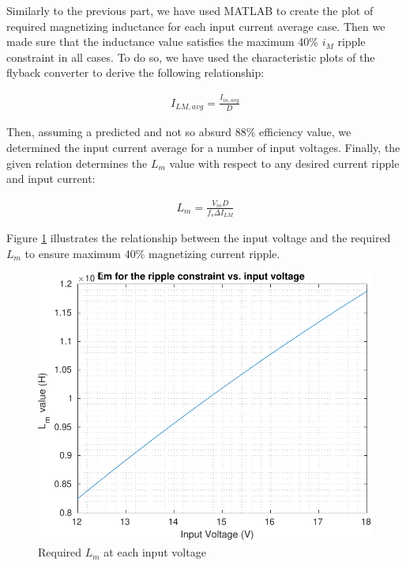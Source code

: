 \documentclass[12pt]{article}
\begin{document}
\begin{itemize}
        Similarly to the previous part, we have used MATLAB to create the plot of required magnetizing inductance for each input current average case. Then we made sure that the inductance value satisfies the maximum 40\% $i_M$ ripple constraint in all cases. To do so, we have used the characteristic plots of the flyback converter to derive the following relationship:

        \begin{align*}
            I_{LM, avg} = \frac{I_{in,avg}}{D}
        \end{align*}

        Then, assuming a predicted and not so absurd 88\% efficiency value, we determined the input current average for a number of input voltages. Finally, the given relation determines the $L_m$ value with respect to any desired current ripple and input current:

        \begin{align*}
            L_m = \frac{V_{in}D}{f_s\Delta I_{LM}}
        \end{align*}

        Figure \ref{fig:VinvsLm} illustrates the relationship between the input voltage and the required $L_m$ to ensure maximum 40\% magnetizing current ripple.

        \begin{figure}[H]
            \centering
            \includegraphics{img/VinvsLm.pdf}
            \caption{Required $L_m$ at each input voltage}
            \label{fig:VinvsLm}
        \end{figure}


\end{itemize}
\end{document}
